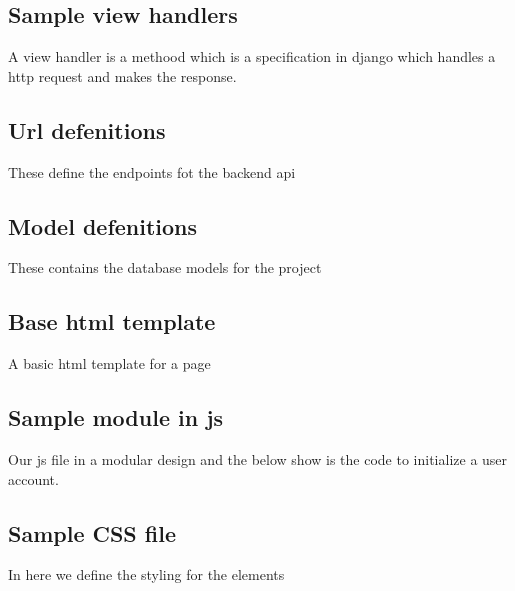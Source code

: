 \subsection{Sample view handlers}
A view handler is a methood which is a specification in django which handles a http request and makes the response.



\subsection{Url defenitions}
These define the endpoints fot the backend api



\subsection{Model defenitions}
These contains the database models for the project



\subsection{Base html template}
A basic html template for a page



\subsection{Sample module in js}
Our js file in a modular design and the below show is the code to initialize a user account.



\subsection{Sample CSS file}
In here we define the styling for the elements


